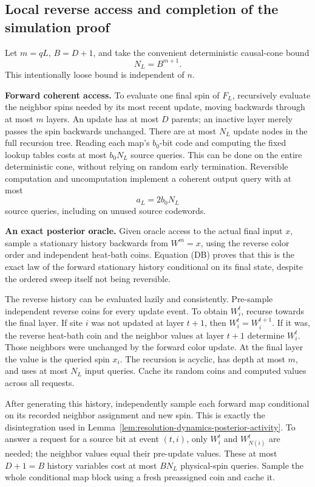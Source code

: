 \subsection{Local reverse access and completion of the simulation proof}
\label{resolution-dynamics:simulation}

Let \(m=qL\), \(B=D+1\), and take the convenient deterministic
causal-cone bound
\[
 N_L=B^{m+1}.
\]
This intentionally loose bound is independent of \(n\).

\textbf{Forward coherent access.}
To evaluate one final spin of \(F_L\), recursively evaluate the
neighbor spins needed by its most recent update, moving backwards
through at most \(m\) layers. An update has at most \(D\) parents;
an inactive layer merely passes the spin backwards unchanged.
There are at most \(N_L\) update nodes in the full recursion tree.
Reading each map's \(b_0\)-bit code and computing the fixed lookup
tables costs at most \(b_0N_L\) source queries. This can be done on
the entire deterministic cone, without relying on random early
termination. Reversible computation and uncomputation implement a
coherent output query with at most
\[
 a_L=2b_0N_L
\]
source queries, including on unused source codewords.

\textbf{An exact posterior oracle.}
Given oracle access to the actual final input \(x\), sample a
stationary history backwards from \(W^m=x\), using the reverse color
order and independent heat-bath coins. Equation (DB) proves that this
is the exact law of the forward stationary history conditional on its
final state, despite the ordered sweep itself not being reversible.

The reverse history can be evaluated lazily and consistently.
Pre-sample independent reverse coins for every update event. To obtain
\(W_i^t\), recurse towards the final layer. If site \(i\) was not
updated at layer \(t+1\), then \(W_i^t=W_i^{t+1}\). If it was,
the reverse heat-bath coin and the neighbor values at layer \(t+1\)
determine \(W_i^t\). Those neighbors were unchanged by the forward
color update. At the final layer the value is the queried spin
\(x_i\). The recursion is acyclic, has depth at most \(m\), and
uses at most \(N_L\) input queries. Cache its random coins and
computed values across all requests.

After generating this history, independently sample each forward map
conditional on its recorded neighbor assignment and new spin. This
is exactly the disintegration used in
Lemma~\ref{lem:resolution-dynamics-posterior-activity}. To answer a
request for a source bit at event \((t,i)\), only
\(W_i^t\) and \(W_{N(i)}^t\) are needed; the neighbor values equal
their pre-update values. These at most \(D+1=B\) history variables
cost at most \(BN_L\) physical-spin queries. Sample the whole
conditional map block using a fresh preassigned coin and cache it.

